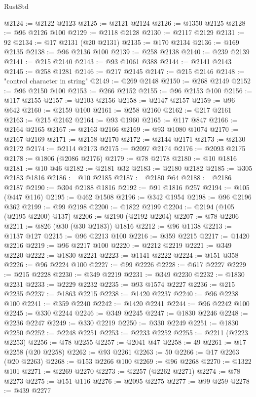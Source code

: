 \begin{lexlean}{RustStd}
\begin{coremodule}
@2124 := @2122 @2123
@2125 := @2121 @2124
@2126 := @1350 @2125
@2128 := @96 @2126 @100
@2129 := @2118 @2128
@2130 := @2117 @2129
@2131 := 92
@2134 := @17 @2131 (@20 @2131)
@2135 := @170 @2134
@2136 := @169 @2135
@2138 := @96 @2136 @100
@2139 := @258 @2138
@2140 := @239 @2139
@2141 := @215 @2140
@2143 := @93 @1061 @388
@2144 := @2141 @2143
@2145 := @258 @1281
@2146 := @217 @2145
@2147 := @215 @2146
@2148 := "control character in string"
@2149 := @269 @2148
@2150 := @268 @2149
@2152 := @96 @2150 @100
@2153 := @266 @2152
@2155 := @96 @2153 @100
@2156 := @117 @2155
@2157 := @2103 @2156
@2158 := @2147 @2157
@2159 := @96 @642
@2160 := @2159 @100
@2161 := @258 @2160
@2162 := @217 @2161
@2163 := @215 @2162
@2164 := @93 @1960
@2165 := @117 @847
@2166 := @2164 @2165
@2167 := @2163 @2166
@2169 := @93 @1080 @1074
@2170 := @2167 @2169
@2171 := @2158 @2170
@2172 := @2144 @2171
@2173 := @2130 @2172
@2174 := @2114 @2173
@2175 := @2097 @2174
@2176 := @2093 @2175
@2178 := @1806 (@2086 @2176)
@2179 := @78 @2178
@2180 := @10 @1816
@2181 := @10 @46
@2182 := @2181 @32
@2183 := @2180 @2182
@2185 := @305 @2183 @1816
@2186 := @10 @2185
@2187 := @2180 @64
@2188 := @2186 @2187
@2190 := @304 @2188 @1816
@2192 := @91 @1816 @257
@2194 := @105 (@447 @116)
@2195 := @462 @1508
@2196 := @342 @1954
@2198 := @96 @2196 @362
@2199 := @99 @2198
@2200 := @1822 @2199
@2204 := @2194 (@105 (@2195 @2200) @137)
@2206 := @2190 (@2192 @2204)
@2207 := @78 @2206
@2211 := @826 (@30 (@30 @2183)) @1816
@2212 := @96 @1138
@2213 := @1137 @127
@2215 := @96 @2213 @100
@2216 := @359 @2215
@2217 := @1420 @2216
@2219 := @96 @2217 @100
@2220 := @2212 @2219
@2221 := @349 @2220
@2222 := @1830 @2221
@2223 := @1141 @2222
@2224 := @151 @358
@2226 := @96 @2224 @100
@2227 := @99 @2226
@2228 := @617 @2227
@2229 := @215 @2228
@2230 := @349 @2219
@2231 := @349 @2230
@2232 := @1830 @2231
@2233 := @2229 @2232
@2235 := @93 @1574 @2227
@2236 := @215 @2235
@2237 := @1863 @2215
@2238 := @1420 @2237
@2240 := @96 @2238 @100
@2241 := @359 @2240
@2242 := @1420 @2241
@2244 := @96 @2242 @100
@2245 := @330 @2244
@2246 := @349 @2245
@2247 := @1830 @2246
@2248 := @2236 @2247
@2249 := @330 @2219
@2250 := @330 @2249
@2251 := @1830 @2250
@2252 := @2248 @2251
@2253 := @2233 @2252
@2255 := @2211 (@2223 @2253)
@2256 := @78 @2255
@2257 := @2041 @47
@2258 := 49
@2261 := @17 @2258 (@20 @2258)
@2262 := @93 @2261
@2263 := 50
@2266 := @17 @2263 (@20 @2263)
@2268 := @153 @2266 @100
@2269 := @96 @2268
@2270 := @1322 @101
@2271 := @2269 @2270
@2273 := @2257 (@2262 @2271)
@2274 := @78 @2273
@2275 := @151 @116
@2276 := @2095 @2275
@2277 := @99 @259
@2278 := @439 @2277

\end{coremodule}
\end{lexlean}
